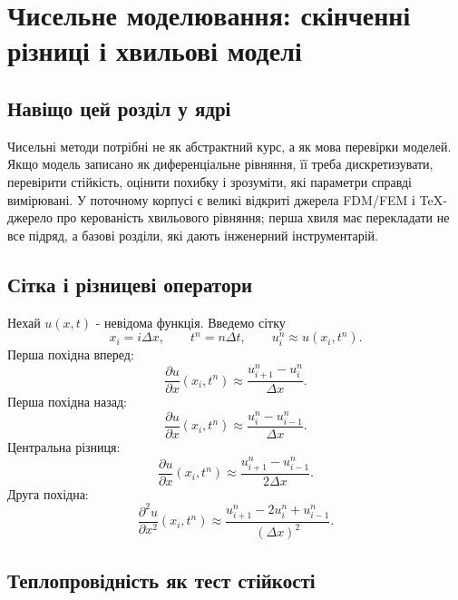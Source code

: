 \chapter{Чисельне моделювання: скінченні різниці і хвильові моделі}

\section{Навіщо цей розділ у ядрі}

Чисельні методи потрібні не як абстрактний курс, а як мова перевірки моделей. Якщо модель записано як диференціальне рівняння, її треба дискретизувати, перевірити стійкість, оцінити похибку і зрозуміти, які параметри справді вимірювані. У поточному корпусі є великі відкриті джерела FDM/FEM і TeX-джерело про керованість хвильового рівняння; перша хвиля має перекладати не все підряд, а базові розділи, які дають інженерний інструментарій.

\section{Сітка і різницеві оператори}

Нехай $u(x,t)$ - невідома функція. Введемо сітку
\begin{equation}
    x_i=i\Delta x,
    \qquad
    t^n=n\Delta t,
    \qquad
    u_i^n\approx u(x_i,t^n).
\end{equation}
Перша похідна вперед:
\begin{equation}
    \frac{\partial u}{\partial x}(x_i,t^n)
    \approx
    \frac{u_{i+1}^n-u_i^n}{\Delta x}.
\end{equation}
Перша похідна назад:
\begin{equation}
    \frac{\partial u}{\partial x}(x_i,t^n)
    \approx
    \frac{u_i^n-u_{i-1}^n}{\Delta x}.
\end{equation}
Центральна різниця:
\begin{equation}
    \frac{\partial u}{\partial x}(x_i,t^n)
    \approx
    \frac{u_{i+1}^n-u_{i-1}^n}{2\Delta x}.
\end{equation}
Друга похідна:
\begin{equation}
    \frac{\partial^2u}{\partial x^2}(x_i,t^n)
    \approx
    \frac{u_{i+1}^n-2u_i^n+u_{i-1}^n}{(\Delta x)^2}.
\end{equation}

\section{Теплопровідність як тест стійкості}

